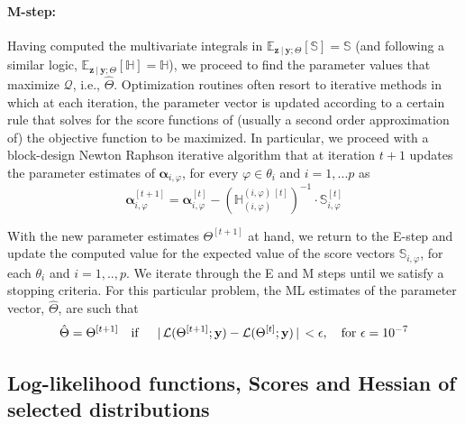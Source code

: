 \documentclass[11pt, a4paper]{article}
\newcommand{\cond}{\!~|~\!}
\begin{document}
\paragraph{M-step:} Having computed the multivariate integrals in  $\mathbb{E}_{\mathbf{z}\cond\mathbf{y}; \Theta}\left[\mathbb{S}\right] = \mathbb{S}$ (and following a similar logic, $\mathbb{E}_{\mathbf{z}\cond\mathbf{y}; \Theta}\left[\mathbb{H}\right] = \mathbb{H}$), we proceed to find the parameter values that maximize $\mathcal{Q}$, i.e., $\hat{\Theta}$. Optimization routines often resort to iterative methods in which at each iteration, the parameter vector is updated according to a certain rule that solves for the score functions of (usually a second order approximation of) the objective function to be maximized. In particular, we proceed with a block-design Newton Raphson iterative algorithm that at iteration $t+1$ updates the parameter estimates of $\bm{\alpha}_{i,\varphi}$, for every $\varphi \in \theta_i$ and $i = 1,...p$ as
\begin{equation}
\bm{\alpha}_{i,\varphi}^{[t+1]} = \bm{\alpha}_{i,\varphi}^{[t]} - \left(\mathbb{H}^{(i,\varphi)~[t]}_{(i,\varphi)}\right)^{-1} \cdot \mathbb{S}_{i,\varphi}^{[t]} \label{eq:A4newrap} \tag{A4}
\end{equation}

With the new parameter estimates $\Theta^{[t+1]}$ at hand, we return to the E-step and update the computed value for the expected value of the score vectors $\mathbb{S}_{i,\varphi}$, for each $\theta_i$ and $i=1,..,p$. We iterate through the E and M steps until we satisfy a stopping criteria. For this particular problem, the ML estimates of the parameter vector, $\hat{\Theta}$, are such that
\begin{equation*}
\hat{\Theta} = \Theta^{[t+1]} \text{\quad if \quad}  \cond \mathcal{L}(\Theta^{[t+1]};\mathbf{y}) - \mathcal{L}(\Theta^{[t]};\mathbf{y}) \cond < \epsilon, \text{\quad for } \epsilon = 10^{-7}
\end{equation*}

\clearpage

\subsection{Log-likelihood functions, Scores and Hessian of selected distributions} \label{sec:AppAnalytical}
\vspace{0.5in}
\end{document}

